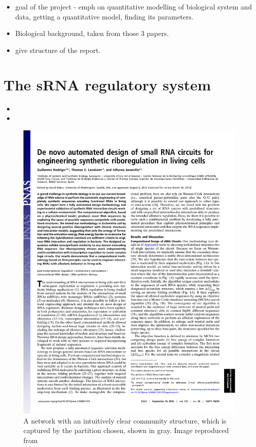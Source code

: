 \documentclass[10pt,journal]{./IEEE_latex_class/IEEEtran}
\begin{document}
 \begin{itemize}
 \item goal of the project - emph on quantitative modelling of biological system and data, getting a quantitative model, finding its parameters.
 \item Biological background, taken from those 3 papers.
 \item give structure of the report.
 \end{itemize}

\section{The sRNA regulatory system}
\label{The sRNA regulatory system}

 \begin{itemize}
 \item  
 \item

 \end{itemize}
 
 

\begin{figure}[H]
\centering
\includegraphics[trim = 60 630 300 30,page=2,clip = true]{pnas1203831109.pdf}
\caption{A network with an intuitively clear community structure, which is captured by the partition chosen, shown in gray. Image reproduced from \cite{community_figure}}
\label{community}
\end{figure}
\end{document}
